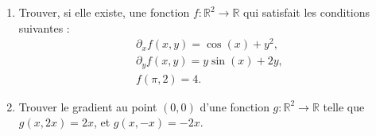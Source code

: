 \begin{exercice}\label{exoGeomAnal-0047}

  \begin{enumerate}
  \item Trouver, si elle existe, une fonction $f: \mathbb{R}^2\to \mathbb{R}$ qui satisfait les conditions suivantes :
    \begin{equation}
      \begin{aligned}
        \partial_x f(x,y)= \cos(x)+ y^2, \\ 
        \partial_y f(x,y)= y\sin(x)+2y, \\
        f(\pi,2)= 4. 
      \end{aligned}
    \end{equation}
\item Trouver le gradient au point $(0,0)$ d'une fonction $g: \mathbb{R}^2\to \mathbb{R}$ telle que $g(x,2x)=2x$, et $g(x,-x)=-2x$. 
  \end{enumerate}

\end{exercice}
